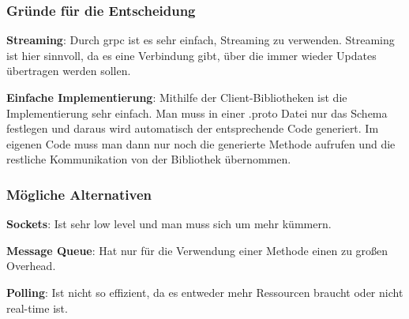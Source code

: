 \subsubsection{Gründe für die Entscheidung}\label{subsubsec:grunde-fur-die-entscheidung-01}

\textbf{Streaming}: Durch grpc ist es sehr einfach, Streaming zu verwenden.
Streaming ist hier sinnvoll, da es eine Verbindung gibt, über die immer wieder Updates übertragen werden sollen.

\textbf{Einfache Implementierung}: Mithilfe der Client-Bibliotheken ist die Implementierung sehr einfach.
Man muss in einer .proto Datei nur das Schema festlegen und daraus wird automatisch der entsprechende Code generiert.
Im eigenen Code muss man dann nur noch die generierte Methode aufrufen und die restliche Kommunikation von der Bibliothek übernommen.

\subsubsection{Mögliche Alternativen}\label{subsubsec:mogliche-alternativen-01}

\textbf{Sockets}: Ist sehr low level und man muss sich um mehr kümmern.

\textbf{Message Queue}: Hat nur für die Verwendung einer Methode einen zu großen Overhead.

\textbf{Polling}: Ist nicht so effizient, da es entweder mehr Ressourcen braucht oder nicht real-time ist.
